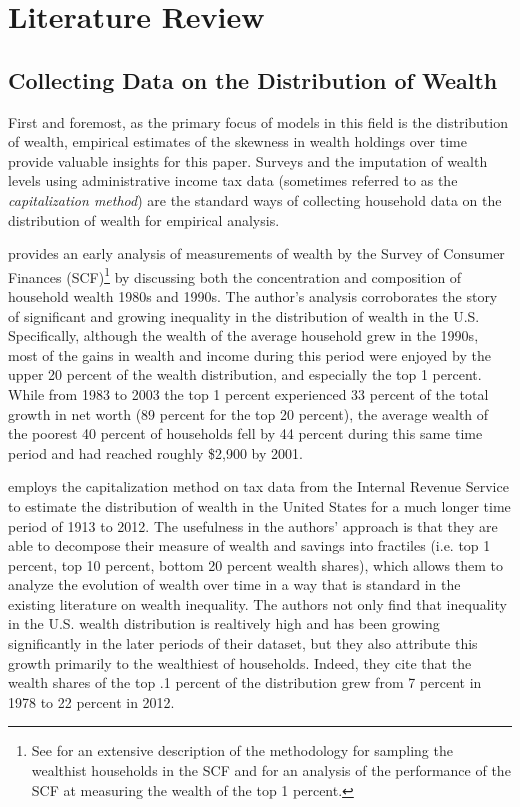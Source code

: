 \documentclass[\econtexRoot/Chp1]{subfiles}
\begin{document}
\onlyinsubfile{\setcounter{section}{1}}
\section{Literature Review}
\notinsubfile{\label{sec:Literature Review}}

\subsection{Collecting Data on the Distribution of Wealth}

\par First and foremost, as the primary focus of models in this field is the distribution of wealth, empirical estimates of the skewness in wealth holdings over time provide valuable insights for this paper. Surveys and the imputation of wealth levels using administrative income tax data (sometimes referred to as the \textit{capitalization method}) are the standard ways of collecting household data on the distribution of wealth for empirical analysis.

\par \cite{wolff2004} provides an early analysis of measurements of wealth by the Survey of Consumer Finances (SCF)\footnote{ See \cite{kennickell2017a} for an extensive description of the methodology for sampling the wealthist households in the SCF and \cite{kennickell2017b} for an analysis of the performance of the SCF at measuring the wealth of the top 1 percent.} by discussing both the concentration and composition of household wealth 1980s and 1990s. The author's analysis corroborates the story of significant and growing inequality in the distribution of wealth in the U.S. Specifically, although the wealth of the average household grew in the 1990s, most of the gains in wealth and income during this period were enjoyed by the upper 20 percent of the wealth distribution, and especially the top 1 percent. While from 1983 to 2003 the top 1 percent experienced 33 percent of the total growth in net worth (89 percent for the top 20 percent), the average wealth of the poorest 40 percent of households fell by 44 percent during this same time period and had reached roughly \$2,900 by 2001.

\cite{sz16} employs the capitalization method on tax data from the Internal Revenue Service to estimate the distribution of wealth in the United States for a much longer time period of 1913 to 2012. The usefulness in the authors' approach is that they are able to decompose their measure of wealth and savings into fractiles (i.e. top 1 percent, top 10 percent, bottom 20 percent wealth shares), which allows them to analyze the evolution of wealth over time in a way that is standard in the existing literature on wealth inequality. The authors not only find that inequality in the U.S. wealth distribution is realtively high and has been growing significantly in the later periods of their dataset, but they also attribute this growth primarily to the wealthiest of households. Indeed, they cite that the wealth shares of the top .1 percent of the distribution grew from 7 percent in 1978 to 22 percent in 2012. 
\end{document}
